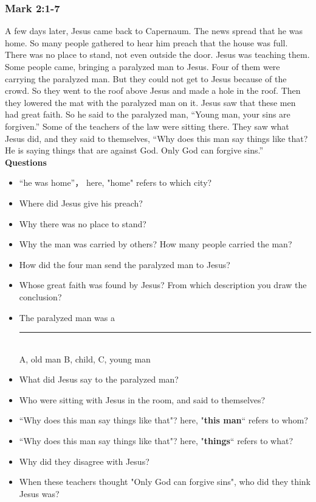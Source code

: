 \subsubsection{\large{Mark 2:1-7}}
A few days later, Jesus came back to Capernaum. The news spread that he was home. So many people gathered to hear him preach that the house was full. There was no place to stand, not even outside the door. Jesus was teaching them. Some people came, bringing a paralyzed man to Jesus. Four of them were carrying the paralyzed man. But they could not get to Jesus because of the crowd. So they went to the roof above Jesus and made a hole in the roof. Then they lowered the mat with the paralyzed man on it. Jesus saw that these men had great faith. So he said to the paralyzed man, “Young man, your sins are forgiven.” Some of the teachers of the law were sitting there. They saw what Jesus did, and they said to themselves, “Why does this man say things like that? He is saying things that are against God. Only God can forgive sins.” \\
\vspace{.25cm}
\textbf{Questions}\vspace{-.5cm}
\begin{itemize}[noitemsep]
\item “he was home”， here, "home" refers to which city?
\item Where did Jesus give his preach?
\item Why there was no place to stand?
\item Why the man was carried by others? How many people carried the man?
\item How did the four man send the paralyzed man to Jesus?
\item Whose great faith was found by Jesus? From which description you draw the conclusion?
\item The paralyzed man was a  \rule[0cm]{1cm}{0.4pt}\\
A, old man \hspace{1cm} B, child, \hspace{1cm} C, young man
\item What did Jesus say to the paralyzed man?
\item Who were sitting with Jesus in the room, and said to themselves?
\item“Why does this man say things like that"? here, "\textbf{this man}“ refers to whom?
\item“Why does this man say things like that"? here, "\textbf{things}“ refers to what?
\item Why did they disagree with Jesus?
\item When these teachers thought "Only God can forgive sins", who did they think Jesus was?
\end{itemize}


